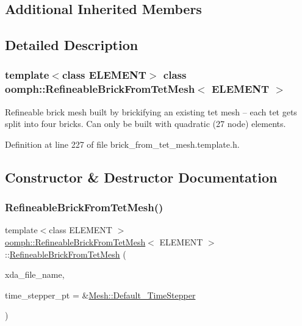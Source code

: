\subsection*{Additional Inherited Members}


\subsection{Detailed Description}
\subsubsection*{template$<$class E\+L\+E\+M\+E\+NT$>$\newline
class oomph\+::\+Refineable\+Brick\+From\+Tet\+Mesh$<$ E\+L\+E\+M\+E\+N\+T $>$}

Refineable brick mesh built by brickifying an existing tet mesh -- each tet gets split into four bricks. Can only be built with quadratic (27 node) elements. 

Definition at line 227 of file brick\+\_\+from\+\_\+tet\+\_\+mesh.\+template.\+h.



\subsection{Constructor \& Destructor Documentation}
\mbox{\label{classoomph_1_1RefineableBrickFromTetMesh_ad46067054ab0f2d078171060956821b4}} 
\subsubsection{\texorpdfstring{Refineable\+Brick\+From\+Tet\+Mesh()}{RefineableBrickFromTetMesh()}\hspace{0.1cm}{\footnotesize\ttfamily [1/2]}}
{\footnotesize\ttfamily template$<$class E\+L\+E\+M\+E\+NT $>$ \\
\hyperlink{classoomph_1_1RefineableBrickFromTetMesh}{oomph\+::\+Refineable\+Brick\+From\+Tet\+Mesh}$<$ E\+L\+E\+M\+E\+NT $>$\+::\hyperlink{classoomph_1_1RefineableBrickFromTetMesh}{Refineable\+Brick\+From\+Tet\+Mesh} (\begin{DoxyParamCaption}\item[{const std\+::string}]{xda\+\_\+file\+\_\+name,  }\item[{\hyperlink{classoomph_1_1TimeStepper}{Time\+Stepper} $\ast$}]{time\+\_\+stepper\+\_\+pt = {\ttfamily \&\hyperlink{classoomph_1_1Mesh_a12243d0fee2b1fcee729ee5a4777ea10}{Mesh\+::\+Default\+\_\+\+Time\+Stepper}} }\end{DoxyParamCaption})\hspace{0.3cm}{\ttfamily [inline]}}



